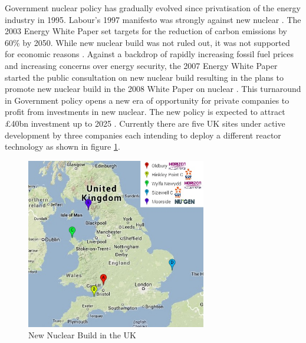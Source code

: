 Government nuclear policy has gradually evolved since privatisation of the energy industry in 1995. 
Labour’s 1997 manifesto was strongly against new nuclear \cite{Birmingham2012}. 
The 2003 Energy White Paper set targets for the reduction of carbon emissions by 60\% by 2050. 
While new nuclear build was not ruled out, it was not supported for economic reasons \cite{WP2003}. 
Against a backdrop of rapidly increasing fossil fuel prices and increasing concerns over energy security, the 2007 Energy White Paper started the public consultation on new nuclear build \cite{WP2007} resulting in the plans to promote new nuclear build in the 2008 White Paper on nuclear \cite{WP2008}.
This turnaround in Government policy opens a new era of opportunity for private companies to profit from investments in new nuclear. 
The new policy is expected to attract \pounds40bn investment up to 2025 \cite{Birmingham2012}.
Currently there are five UK sites under active development by three companies each intending to deploy a different reactor technology as shown in figure \ref{figure:NNB}.

\begin{figure}[!h]
\centering
\includegraphics[width = 0.7\textwidth]{Figures/NewNuclear.jpg}
\caption{New Nuclear Build in the UK}
\label{figure:NNB}
\end{figure}

